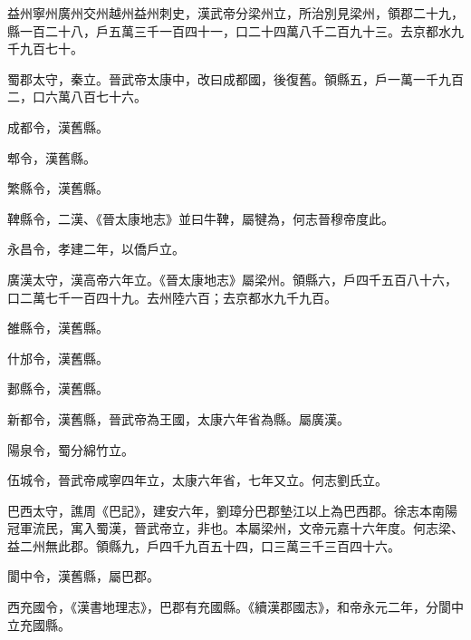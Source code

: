 
\begin{pinyinscope}

 益州寧州廣州交州越州益州刺史，漢武帝分梁州立，所治別見梁州，領郡二十九，縣一百二十八，戶五萬三千一百四十一，口二十四萬八千二百九十三。去京都水九千九百七十。



 蜀郡太守，秦立。晉武帝太康中，改曰成都國，後復舊。領縣五，戶一萬一千九百二，口六萬八百七十六。



 成都令，漢舊縣。



 郫令，漢舊縣。



 繁縣令，漢舊縣。



 鞞縣令，二漢、《晉太康地志》並曰牛鞞，屬犍為，何志晉穆帝度此。



 永昌令，孝建二年，以僑戶立。



 廣漢太守，漢高帝六年立。《晉太康地志》屬梁州。領縣六，戶四千五百八十六，口二萬七千一百四十九。去州陸六百；去京都水九千九百。



 雒縣令，漢舊縣。



 什邡令，漢舊縣。



 郪縣令，漢舊縣。



 新都令，漢舊縣，晉武帝為王國，太康六年省為縣。屬廣漢。



 陽泉令，蜀分綿竹立。



 伍城令，晉武帝咸寧四年立，太康六年省，七年又立。何志劉氏立。



 巴西太守，譙周《巴記》，建安六年，劉璋分巴郡墊江以上為巴西郡。徐志本南陽冠軍流民，寓入蜀漢，晉武帝立，非也。本屬梁州，文帝元嘉十六年度。何志梁、益二州無此郡。領縣九，戶四千九百五十四，口三萬三千三百四十六。



 閬中令，漢舊縣，屬巴郡。



 西充國令，《漢書地理志》，巴郡有充國縣。《續漢郡國志》，和帝永元二年，分閬中立充國縣。




\end{pinyinscope}
